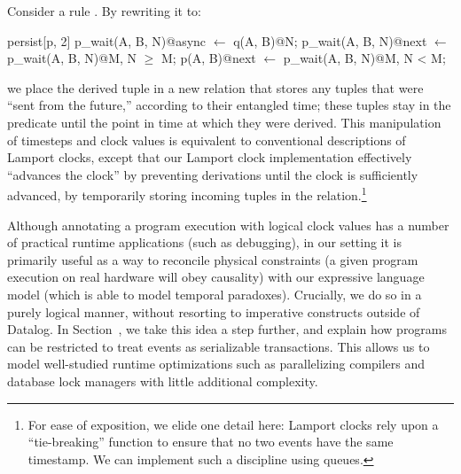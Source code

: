 Consider a rule .  By rewriting it
to:

\begin{Dedalus}
persist[p, 2]
p\_wait(A, B, N)@async \(\leftarrow\) q(A, B)@N;
p\_wait(A, B, N)@next \(\leftarrow\) p\_wait(A, B, N)@M, N \(\ge\) M;
p(A, B)@next \(\leftarrow\) p\_wait(A, B, N)@M, N < M;
\end{Dedalus}

\noindent we place the derived tuple in a new relation  that
stores any tuples that were ``sent from the future,'' according to their
entangled time; these tuples stay in the  predicate until the
point in time at which they were derived.  
This manipulation of timesteps and clock values is equivalent to conventional
descriptions of Lamport clocks, except that our Lamport clock implementation
effectively ``advances the clock'' by preventing derivations until the clock is
sufficiently advanced, by temporarily storing incoming tuples in the
 relation.\footnote{For ease of exposition, we elide one
detail here: Lamport clocks rely upon a ``tie-breaking'' function to ensure
that no two events have the same timestamp.  We can implement such a discipline
using queues.}

Although annotating a program execution with logical clock values has
a number of practical runtime applications (such as debugging), in our
setting it is primarily useful as a way to reconcile physical
constraints (a given program execution on real hardware will obey
causality) with our expressive language model (which is able to model
temporal paradoxes).  Crucially, we do so in a purely logical manner,
without resorting to imperative constructs outside of Datalog.  In
Section~, we take this idea a step further, and explain
how \lang programs can be restricted to treat events as serializable
transactions.  This allows us to model well-studied runtime
optimizations such as parallelizing compilers and database lock
managers with little additional complexity.


